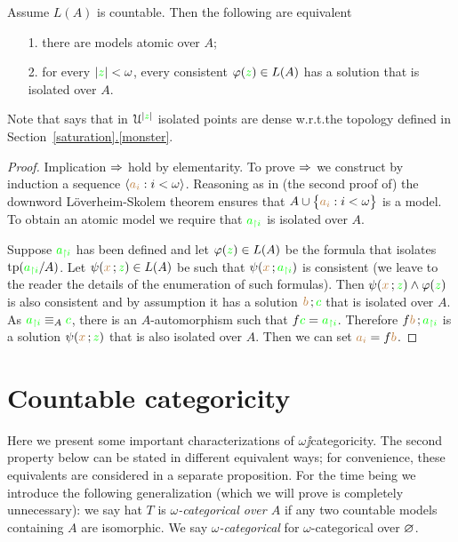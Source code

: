 \documentclass[creche.tex]{subfiles}
\begin{document}
\begin{proposition}\label{prop_idolated_type_dense}
Assume $L(A)$ is countable. Then the following are equivalent
\begin{itemize}
\item[1.] there are models atomic over $A$;
\item[2.] for every $|{\color{green} z}|<\omega$, every consistent $\varphi({\color{green} z})\in L(A)$ has a solution that is isolated over $A$.
\end{itemize}
\end{proposition} 
Note that  says that in $\EuScript U^{|{\color{green} z}|}$ isolated points are dense w.r.t.\@ the topology defined in Section~\hyperref[saturation]{\ref*{saturation}.\ref*{monster}}.
\begin{proof}
Implication $\Rightarrow$ hold by elementarity. To prove $\Rightarrow$ we construct by induction a sequence $\langle{\color{brown}a_i}:i<\omega\rangle$. Reasoning as in (the second proof of) the downword L\"overheim-Skolem theorem ensures that $A\cup\big\{{\color{brown} a_i}:i<\omega\big\}$ is a model. To obtain an atomic model we require that ${\color{green} a_{\restriction i}}$ is isolated over $A$. 

Suppose ${\color{green} a_{\restriction i}}$ has been defined and let $\varphi({\color{green} z})\in L(A)$ be the formula that isolates ${\rm tp}({\color{green} a_{\restriction i}}/A)$. Let $\psi({\color{brown} x}\,;{\color{green} z})\in L(A)$ be such that $\psi({\color{brown} x}\,;{\color{green} a_{\restriction i}})$ is consistent (we leave to the reader the details of the enumeration of such formulas). Then $\psi({\color{brown} x}\,;{\color{green} z})\wedge\varphi({\color{green} z})$ is also consistent and by assumption it has a solution ${\color{brown} b}\,;{\color{green} c}$ that is isolated over $A$. As ${\color{green} a_{\restriction i}}\equiv_A{\color{green} c}$, there is an $A$-automorphism such that $f{\color{green} c}={\color{green} a_{\restriction i}}$. Therefore $f{\color{brown} b}\,;{\color{green} a_{\restriction i}}$ is a solution $\psi({\color{brown} x}\,;{\color{green} z})$ that is also isolated over $A$. Then we can set ${\color{brown} a_i}=f{\color{brown} b}$. 
\end{proof}


\section{Countable categoricity}

Here we present some important characterizations of $\omega\jj$categoricity. The second property below can be stated in different equivalent ways; for convenience, these equivalents are considered in a separate proposition. For the time being we introduce the following generalization (which we will prove is completely unnecessary): we say hat $T$ is \emph{$\omega$-categorical over $A$\/} if any two countable models containing $A$ are isomorphic. We say \emph{$\omega$-categorical\/} for $\omega$-categorical over $\varnothing$.
\end{document}
